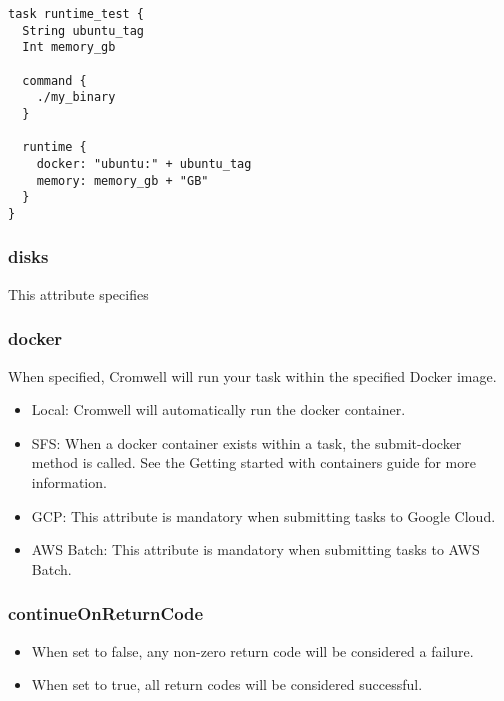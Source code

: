 \documentclass[
]{book}
\providecommand{\tightlist}{%
  \setlength{\itemsep}{0pt}\setlength{\parskip}{0pt}}
\begin{document}
\begin{verbatim}
task runtime_test {
  String ubuntu_tag
  Int memory_gb

  command {
    ./my_binary
  }

  runtime {
    docker: "ubuntu:" + ubuntu_tag
    memory: memory_gb + "GB"
  }
}
\end{verbatim}

\hypertarget{disks}{%
\subsubsection*{disks}\label{disks}}

This attribute specifies

\hypertarget{docker-1}{%
\subsubsection*{docker}\label{docker-1}}

When specified, Cromwell will run your task within the specified Docker image.

\begin{itemize}
\tightlist
\item
  Local: Cromwell will automatically run the docker container.
\item
  SFS: When a docker container exists within a task, the submit-docker method is
  called. See the Getting started with containers guide for more information.
\item
  GCP: This attribute is mandatory when submitting tasks to Google Cloud.
\item
  AWS Batch: This attribute is mandatory when submitting tasks to AWS Batch.
\end{itemize}

\hypertarget{continueonreturncode}{%
\subsubsection*{continueOnReturnCode}\label{continueonreturncode}}

\begin{itemize}
\tightlist
\item
  When set to false, any non-zero return code will be considered a failure.
\item
  When set to true, all return codes will be considered successful.
\end{itemize}
\end{document}
